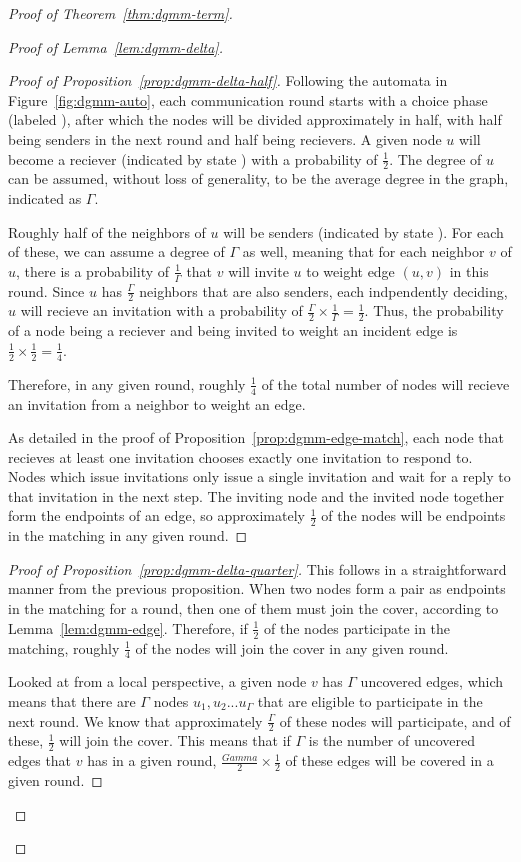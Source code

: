 \begin{proof}[Proof of Theorem~\ref{thm:dgmm-term}]
\begin{proof}[Proof of Lemma~\ref{lem:dgmm-delta}]
\begin{proof}[Proof of Proposition~\ref{prop:dgmm-delta-half}]
Following the automata in Figure~\ref{fig:dgmm-auto}, each communication round starts with a choice phase (labeled \cCd), after which the nodes will be divided approximately in half, with half being senders in the next round and half being recievers. A given node $u$ will become a reciever (indicated by state \cLd) with a probability of $\frac{1}{2}$. The degree of $u$ can be assumed, without loss of generality, to be the average degree in the graph, indicated as $\Gamma$. 

Roughly half of the neighbors of $u$ will be senders (indicated by state \cId). For each of these, we can assume a degree of $\Gamma$ as well, meaning that for each neighbor $v$ of $u$, there is a probability of $\frac{1}{\Gamma}$ that $v$ will invite $u$ to weight edge $(u,v)$ in this round. Since $u$ has $\frac{\Gamma}{2}$ neighbors that are also senders, each indpendently deciding, $u$ will recieve an invitation with a probability of $\frac{\Gamma}{2} \times \frac{1}{\Gamma} = \frac{1}{2}$. Thus, the probability of a node being a reciever and being invited to weight an incident edge is $\frac{1}{2} \times \frac{1}{2} = \frac{1}{4}$. 

Therefore, in any given round, roughly $\frac{1}{4}$ of the total number of nodes will recieve an invitation from a neighbor to weight an edge. 

As detailed in the proof of Proposition~\ref{prop:dgmm-edge-match}, each node that recieves at least one invitation chooses exactly one invitation to respond to. Nodes which issue invitations only issue a single invitation and wait for a reply to that invitation in the next step. The inviting node and the invited node together form the endpoints of an edge, so approximately $\frac{1}{2}$ of the nodes will be endpoints in the matching in any given round.
\end{proof}

\begin{proof}[Proof of Proposition~\ref{prop:dgmm-delta-quarter}]

This follows in a straightforward manner from the previous proposition. When two nodes form a pair as endpoints in the matching for a round, then one of them must join the cover, according to Lemma~\ref{lem:dgmm-edge}. Therefore, if $\frac{1}{2}$ of the nodes participate in the matching, roughly $\frac{1}{4}$ of the nodes will join the cover in any given round.

Looked at from a local perspective, a given node $v$ has $\Gamma$ uncovered edges, which means that there are $\Gamma$ nodes $u_1, u_2 ... u_{\Gamma}$ that are eligible to participate in the next round. We know that approximately $\frac{\Gamma}{2}$ of these nodes will participate, and of these, $\frac{1}{2}$ will join the cover. This means that if $\Gamma$ is the number of uncovered edges that $v$ has in a given round, $\frac{Gamma}{2} \times \frac{1}{2}$ of these edges will be covered in a given round.


\end{proof}
\end{proof}
\end{proof}
